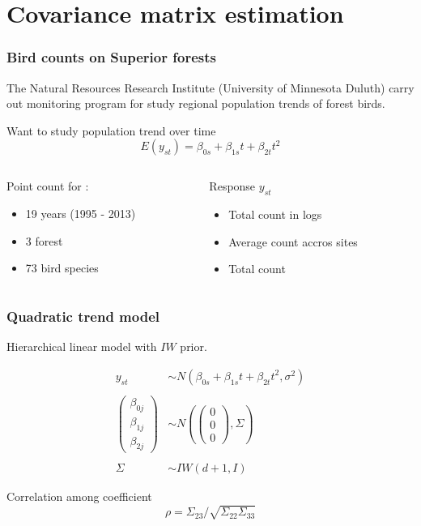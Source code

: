 \documentclass[9pt]{beamer}\usepackage[]{graphicx}\usepackage[]{color}
\begin{document}
\section{ Covariance matrix estimation }
\begin{frame}
\frametitle{Bird counts on Superior forests}
 The Natural Resources Research Institute (University of Minnesota Duluth) carry out monitoring program for study regional population trends of forest birds.
\vspace{.5cm}

Want to study population trend over time
\[
E(y_{st})  = \beta_{0s} + \beta_{1s} t + \beta_{2t}t^2
\]

\begin{columns}
\begin{column}{4cm}
Point count for :
\begin{itemize}
  \item 19 years (1995 - 2013)
  \item 3 forest
  \item 73 bird species
\end{itemize}
\end{column}
\begin{column}{5cm}
Response $y_{st}$
\begin{itemize}
  \item Total count in logs
  \item Average count accros sites
  \item Total count
\end{itemize}

\end{column}
\end{columns}

\end{frame}


\begin{frame}
\frametitle{Quadratic trend model}

Hierarchical linear model with $IW$ prior.

\[\begin{array}{cl}
y_{st}  & \sim  N(\beta_{0s} + \beta_{1s} t + \beta_{2t}t^2, \sigma^2) \\
& \\
\begin{pmatrix} \beta_{0j} \\ \beta_{1j} \\ \beta_{2j} \end{pmatrix} & \sim  N \left( \begin{pmatrix} 0 \\ 0 \\ 0 \end{pmatrix} , \Sigma \right) \\
& \\
\Sigma & \sim  IW(d+1, I)
\end{array}
\]

Correlation among coefficient
\[ \rho = \Sigma_{23}/\sqrt{\Sigma_{22}\Sigma_{33}} \]

\end{frame}
\end{document}
